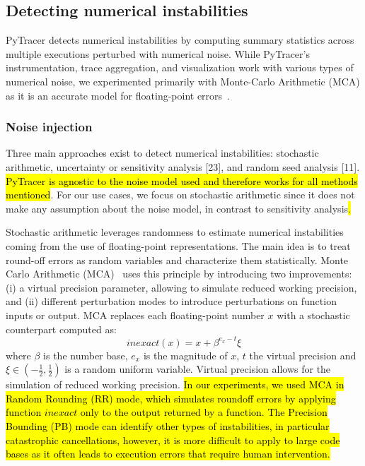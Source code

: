 \documentclass[10pt,journal,compsoc]{IEEEtran}
\newcommand{\pytracer}[0]{PyTracer\xspace}
\DeclareRobustCommand{\add}[1]{\sethlcolor{lightgreen}\hl{#1}}
\DeclareRobustCommand{\addCite}[1]{\textcolor{lightgreen}{\mbox{#1}}}
\begin{document}
\subsection{Detecting numerical instabilities}

\pytracer detects numerical instabilities by computing summary statistics across
multiple executions perturbed with numerical noise. While \pytracer's
instrumentation, trace aggregation, and visualization work with various types of
numerical noise, we experimented primarily with Monte-Carlo Arithmetic (MCA) as
it is an accurate model for floating-point errors~\addCite{\cite{verificarlo}}.

\subsubsection{Noise injection}
\label{sec:fuzzy}

Three  main  approaches  exist  to  detect  numerical  instabilities:
stochastic  arithmetic,  uncertainty  or  sensitivity analysis [23], and random
seed analysis [11].  \add{PyTracer is agnostic to the noise model used and therefore
    works for all methods mentioned}.  For our use cases, we focus on stochastic
arithmetic since it does not make any assumption about the noise model, in
contrast to sensitivity analysis\add{.}

Stochastic arithmetic leverages randomness to estimate numerical instabilities
coming from the use of floating-point representations. The main idea is to treat
round-off errors as random variables and characterize them statistically. Monte 
Carlo Arithmetic (MCA)~\cite{parker1997monte} uses this principle by introducing
two improvements: (i) a virtual precision parameter, allowing to simulate
reduced working precision, and (ii) different perturbation modes to introduce
perturbations on function inputs or output. MCA replaces each floating-point
number $x$ with a stochastic counterpart computed as:
\[
    inexact(x) =  x + \beta^{e_x - t}\xi
\]
where $\beta$ is the number base, $e_x$ is the magnitude of $x$, $t$ the virtual
precision and $\xi \in (-\frac{1}{2},\frac{1}{2})$ is a random uniform variable.
Virtual precision allows for the simulation of reduced working precision.
\add{In our experiments, we used MCA in Random Rounding (RR) mode, which
    simulates roundoff errors by applying function $inexact$ only to the
    output returned by a function. The Precision Bounding (PB) mode can
    identify other types of instabilities, in particular catastrophic
    cancellations, however, it is more difficult to apply to large code bases
    as it often leads to execution errors that require human intervention.}
\end{document}
